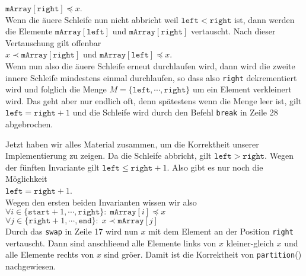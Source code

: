 \begin{enumerate}
      \hspace*{1.3cm} $\mathtt{mArray}[\mathtt{right}] \preceq x$. \\[0.1cm]
      Wenn die \"au\3ere Schleife nun nicht abbricht weil $\texttt{left} < \mathtt{right}$ ist,
      dann werden die Elemente $\mathtt{mArray}[\mathtt{left}]$ und
      $\mathtt{mArray}[\mathtt{right}]$ vertauscht.  Nach dieser Vertauschung gilt 
      offenbar \\[0.1cm]
      \hspace*{1.3cm} 
      $x \prec \mathtt{mArray}[\mathtt{right}]$ \quad und \quad $\mathtt{mArray}[\mathtt{left}] \preceq x$. 
      \\[0.1cm]
      Wenn nun also die \"au\3ere Schleife erneut durchlaufen wird, dann wird die zweite
      innere Schleife mindestens einmal durchlaufen, so dass also \texttt{right}
      dekrementiert wird und folglich die Menge $M = \{ \mathtt{left}, \cdots, \mathtt{right} \}$ 
      um ein Element verkleinert wird.  Das geht aber nur endlich oft, denn sp\"atestens
      wenn die Menge leer ist, gilt $\mathtt{left} = \mathtt{right} + 1$
      und die Schleife wird durch den Befehl \texttt{break} in Zeile 28 abgebrochen. 
\end{enumerate}
Jetzt haben wir alles Material zusammen, um die Korrektheit unserer Implementierung zu zeigen.
Da die Schleife abbricht, gilt $\mathtt{left} > \mathtt{right}$.  Wegen der f\"unften
Invariante gilt $\texttt{left} \leq \mathtt{right} + 1$.  Also gibt es nur noch die
M\"oglichkeit
\\[0.2cm]
\hspace*{1.3cm}
$\texttt{left} = \mathtt{right} +
1$.
\\[0.2cm]  
Wegen den ersten beiden Invarianten
wissen wir also \\[0.1cm]
\hspace*{1.3cm} 
 $\forall i \in \{ \mathtt{start}+1, \cdots, \mathtt{right} \} \colon\; \mathtt{mArray}[i] \preceq x$ \\[0.1cm]
\hspace*{1.3cm} 
 $\forall j \in \{ \mathtt{right}+1, \cdots, \mathtt{end} \} \colon\; x \prec \mathtt{mArray}[j]$
\\[0.1cm]
Durch das \texttt{swap} in Zeile 17 wird nun $x$ mit dem Element an der Position
\texttt{right} vertauscht.  Dann sind anschlie\3end alle Elemente links von $x$
kleiner-gleich $x$ und alle Elemente rechts von $x$ sind gr\"o\3er.
Damit ist die Korrektheit von \texttt{partition}() nachgewiesen.

